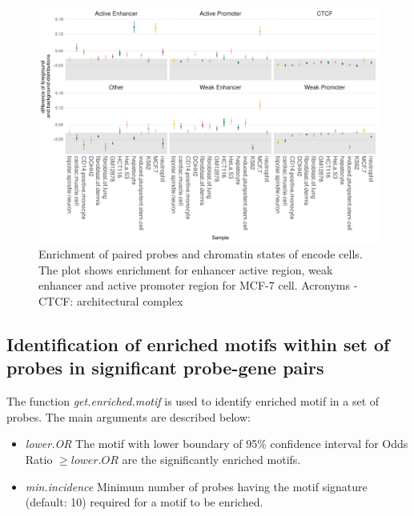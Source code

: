 %
%

\begin{figure}[ht!]
\centering
\includegraphics[width=1.0\textwidth]{images/funcivar.pdf}
\caption{\label{fig:funcivar} Enrichment of paired probes and chromatin states of encode cells. The plot shows enrichment for enhancer active region, weak enhancer  and active promoter region for MCF-7 cell. Acronyms - CTCF: architectural complex}
\end{figure}

\newpage

\subsection*{Identification of enriched motifs within set of probes in significant probe-gene pairs}
The function \textit{get.enriched.motif} is used to identify enriched motif in a set of probes.
The main arguments are described below:
\begin{itemize}
\item \textit{lower.OR}	 The motif with lower boundary of 95\% confidence interval for Odds Ratio $\geq lower.OR$  are the significantly enriched motifs.
\item \textit{min.incidence} Minimum number of probes having the motif signature (default: 10) required for a motif to be enriched.
\end{itemize}

